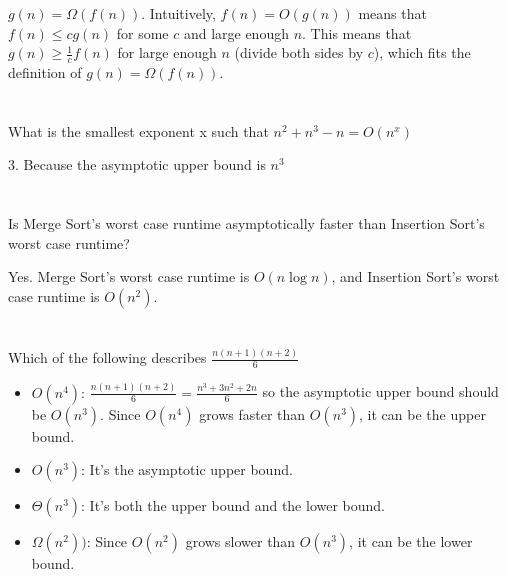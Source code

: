 \documentclass [12pt]{article}
\begin{document}
\begin{Solution}
$g(n) = \Omega(f(n))$. Intuitively, $f(n) = O(g(n))$ means that $f(n) \leq c g(n)$ for some $c$ and large enough $n$. This means that $g(n) \geq \frac{1}{c} f(n)$ for large enough $n$ (divide both sides by $c$), which fits the definition of $g(n) = \Omega(f(n))$.
\end{Solution}


\section{} What is the smallest exponent x such that $n^2 + n^3 - n = O(n^x)$

\begin{Solution}
3. Because the asymptotic upper bound is $n^3$
\end{Solution}


\section{} Is Merge Sort’s worst case runtime asymptotically faster than Insertion Sort’s worst case runtime?

\begin{Solution}
Yes. Merge Sort’s worst case runtime is $O(n \log n)$, and Insertion Sort’s worst case runtime is $O(n^2)$.
\end{Solution}


\section{} Which of the following describes $\frac{n(n+1)(n+2)}{6}$

\begin{Solution}

\begin{itemize}
    \item {$O(n^4)$:}  $\frac{n(n+1)(n+2)}{6} = \frac{n^3 + 3n^2 + 2n}{6}$ so the asymptotic upper bound should be $O(n^3)$. Since $O(n^4)$ grows faster than $O(n^3)$, it can be the upper bound.
    \item {$O(n^3)$:} It's the asymptotic upper bound.
    \item {$\Theta(n^3)$:} It's both the upper bound and the lower bound.
    \item {$\Omega(n^2))$:} Since $O(n^2)$ grows slower than $O(n^3)$, it can be the lower bound.
\end{itemize}

\end{Solution}
\end{document}
